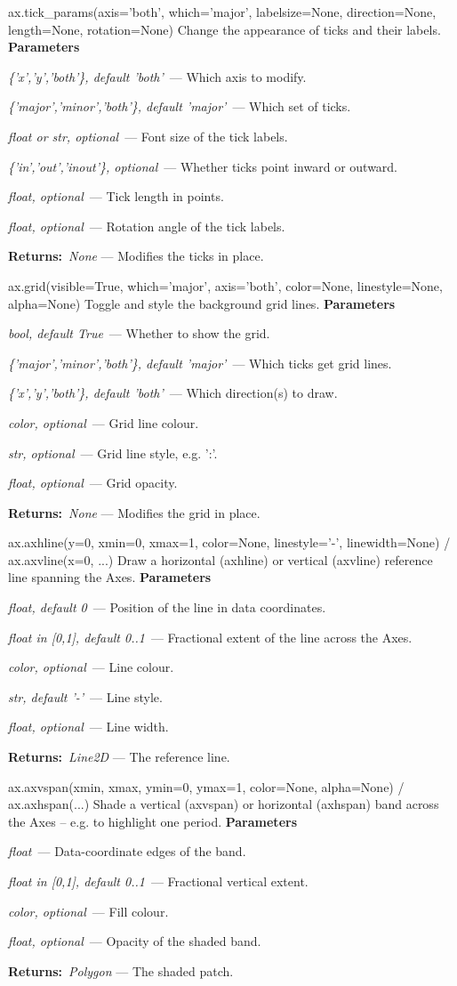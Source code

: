 \documentclass[10pt]{article}
\newenvironment{params}
  {\smallskip\textbf{\small\color{accent}Parameters}\par\nopagebreak
   \begin{description}[leftmargin=1.3em,itemsep=1.5pt,parsep=0pt,topsep=1pt,
      labelindent=0pt,style=sameline,font=\normalfont]}
  {\end{description}}
\newcommand{\pitem}[3]{\item[{\ttfamily\color{accent}#1}]{\itshape #2}\ --- #3}
\newcommand{\preturn}[2]{\smallskip\textbf{\small\color{accent}Returns:}\ {\itshape #1} --- #2\par}
\begin{document}
\begin{func}{ax.tick\_params(axis='both', which='major', labelsize=None, direction=None, length=None, rotation=None)}
Change the appearance of ticks and their labels.
\begin{params}
\pitem{axis}{\{'x','y','both'\}, default 'both'}{Which axis to modify.}
\pitem{which}{\{'major','minor','both'\}, default 'major'}{Which set of ticks.}
\pitem{labelsize}{float or str, optional}{Font size of the tick labels.}
\pitem{direction}{\{'in','out','inout'\}, optional}{Whether ticks point inward or outward.}
\pitem{length}{float, optional}{Tick length in points.}
\pitem{rotation}{float, optional}{Rotation angle of the tick labels.}
\end{params}
\preturn{None}{Modifies the ticks in place.}
\end{func}
\medskip

\begin{func}{ax.grid(visible=True, which='major', axis='both', color=None, linestyle=None, alpha=None)}
Toggle and style the background grid lines.
\begin{params}
\pitem{visible}{bool, default True}{Whether to show the grid.}
\pitem{which}{\{'major','minor','both'\}, default 'major'}{Which ticks get grid lines.}
\pitem{axis}{\{'x','y','both'\}, default 'both'}{Which direction(s) to draw.}
\pitem{color}{color, optional}{Grid line colour.}
\pitem{linestyle}{str, optional}{Grid line style, e.g. ':'.}
\pitem{alpha}{float, optional}{Grid opacity.}
\end{params}
\preturn{None}{Modifies the grid in place.}
\end{func}
\medskip

\begin{func}{ax.axhline(y=0, xmin=0, xmax=1, color=None, linestyle='-', linewidth=None)   /   ax.axvline(x=0, ...)}
Draw a horizontal (axhline) or vertical (axvline) reference line spanning the Axes.
\begin{params}
\pitem{y / x}{float, default 0}{Position of the line in data coordinates.}
\pitem{xmin, xmax / ymin, ymax}{float in [0,1], default 0..1}{Fractional extent of the line across the Axes.}
\pitem{color}{color, optional}{Line colour.}
\pitem{linestyle}{str, default '-'}{Line style.}
\pitem{linewidth}{float, optional}{Line width.}
\end{params}
\preturn{Line2D}{The reference line.}
\end{func}
\medskip

\begin{func}{ax.axvspan(xmin, xmax, ymin=0, ymax=1, color=None, alpha=None)   /   ax.axhspan(...)}
Shade a vertical (axvspan) or horizontal (axhspan) band across the Axes -- e.g. to highlight one period.
\begin{params}
\pitem{xmin, xmax}{float}{Data-coordinate edges of the band.}
\pitem{ymin, ymax}{float in [0,1], default 0..1}{Fractional vertical extent.}
\pitem{color}{color, optional}{Fill colour.}
\pitem{alpha}{float, optional}{Opacity of the shaded band.}
\end{params}
\preturn{Polygon}{The shaded patch.}
\end{func}
\medskip
\end{document}
